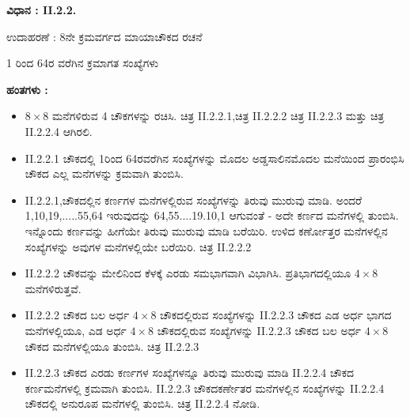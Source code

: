 \textbf{ವಿಧಾನ : II.2.2.}

ಉದಾಹರಣೆ : 8ನೇ ಕ್ರಮವರ್ಗದ ಮಾಯಾಚೌಕದ ರಚನೆ

1 ರಿಂದ 64ರ ವರೆಗಿನ ಕ್ರಮಾಗತ ಸಂಖ್ಯೆಗಳು

\smallskip

\textbf{ಹಂತಗಳು :}
\begin{itemize}
	\item $8 \times 8$ ಮನೆಗಳಿರುವ 4 ಚೌಕಗಳನ್ನು ರಚಿಸಿ. ಚಿತ್ರ II.2.2.1,ಚಿತ್ರ II.2.2.2 ಚಿತ್ರ II.2.2.3 ಮತ್ತು ಚಿತ್ರ II.2.2.4 ಆಗಿರಲಿ.
	\item II.2.2.1 ಚೌಕದಲ್ಲಿ 1ರಿಂದ 64ರವರೆಗಿನ ಸಂಖ್ಯೆಗಳನ್ನು ಮೊದಲ ಅಡ್ಡಸಾಲಿನ\break ಮೊದಲ ಮನೆಯಿಂದ ಪ್ರಾರಂಭಿಸಿ ಚೌಕದ ಎಲ್ಲ ಮನೆಗಳನ್ನು ಕ್ರಮವಾಗಿ ತುಂಬಿಸಿ.
	\item II.2.2.1,ಚೌಕದಲ್ಲಿನ ಕರ್ಣಗಳ ಮನೆಗಳಲ್ಲಿರುವ ಸಂಖ್ಯೆಗಳನ್ನು ತಿರುವು ಮುರುವು ಮಾಡಿ. ಅಂದರೆ 1,10,19,.....55,64 ಇರುವುದನ್ನು 64,55....19.10,1 ಆಗುವಂತೆ - ಅದೇ ಕರ್ಣದ ಮನೆಗಳಲ್ಲಿ ತುಂಬಿಸಿ. ಇನ್ನೊಂದು ಕರ್ಣವನ್ನು ಹೀಗೆಯೇ ತಿರುವು ಮುರುವು ಮಾಡಿ ಬರೆಯಿರಿ. ಉಳಿದ ಕರ್ಣೋತ್ತರ ಮನೆಗಳಲ್ಲಿನ ಸಂಖ್ಯೆ\-ಗಳನ್ನು ಅವುಗಳ ಮನೆಗಳಲ್ಲಿಯೇ ಬರೆಯಿರಿ. ಚಿತ್ರ II.2.2.2
	\item II.2.2.2 ಚೌಕವನ್ನು ಮೇಲಿನಿಂದ ಕೆಳಕ್ಕೆ ಎರಡು ಸಮಭಾಗವಾಗಿ ವಿಭಾಗಿಸಿ. ಪ್ರತಿಭಾಗದಲ್ಲಿಯೂ $4 \times 8$ ಮನೆಗಳಿರುತ್ತವೆ.
	\item II.2.2.2 ಚೌಕದ ಬಲ ಅರ್ಧ $4 \times 8$ ಚೌಕದಲ್ಲಿರುವ ಸಂಖ್ಯೆಗಳನ್ನು II.2.2.3 ಚೌಕದ ಎಡ ಅರ್ಧ ಭಾಗದ ಮನೆಗಳಲ್ಲಿಯೂ, ಎಡ ಅರ್ಧ $4 \times 8$ ಚೌಕದಲ್ಲಿರುವ ಸಂಖ್ಯೆಗಳನ್ನು II.2.2.3 ಚೌಕದ ಬಲ ಅರ್ಧ $4 \times 8$ ಚೌಕದ ಮನೆಗಳಲ್ಲಿಯೂ ತುಂಬಿಸಿ. ಚಿತ್ರ II.2.2.3
	\item II.2.2.3 ಚೌಕದ ಎರಡು ಕರ್ಣಗಳ ಸಂಖ್ಯೆಗಳನ್ನೂ ತಿರುವು ಮುರುವು ಮಾಡಿ II.2.2.4 ಚೌಕದ ಕರ್ಣಮನೆಗಳಲ್ಲಿ ಕ್ರಮವಾಗಿ ತುಂಬಿಸಿ. II.2.2.3 ಚೌಕದ\break ಕರ್ಣೇತರ ಮನೆಗಳಲ್ಲಿನ ಸಂಖ್ಯೆಗಳನ್ನು II.2.2.4 ಚೌಕದಲ್ಲಿ ಅನುರೂಪ ಮನೆ\-ಗಳಲ್ಲಿ ತುಂಬಿಸಿ. ಚಿತ್ರ II.2.2.4 ನೋಡಿ.


\end{itemize}
